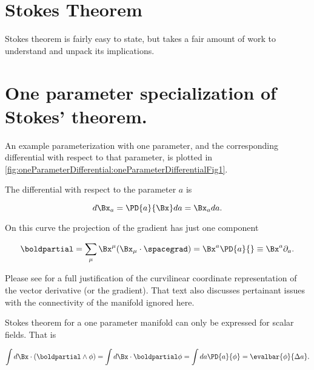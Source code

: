 %
%
\section{Stokes Theorem}

Stokes theorem is fairly easy to state, but takes a fair amount of work to understand and unpack its implications.



\section{One parameter specialization of Stokes' theorem.}

An example parameterization with one parameter, and the corresponding differential with respect to that parameter, is plotted in
\cref{fig:oneParameterDifferential:oneParameterDifferentialFig1}.


The differential with respect to the parameter \( a \) is

\begin{equation}\label{eqn:stokesTheoremCore:20}
d\Bx_a = \PD{a}{\Bx} da = \Bx_a da.
\end{equation}

On this curve the projection of the gradient has just one component

\begin{dmath}\label{eqn:stokesTheoremCore:40}
\boldpartial
=
\sum_\mu \Bx^\mu (\Bx_\mu \cdot \spacegrad)
=
\Bx^a \PD{a}{}
\equiv
\Bx^a \partial_a.
\end{dmath}

Please see \citep{aMacdonaldVAGC} for a full justification of the curvilinear coordinate representation of the vector derivative (or the gradient).  That text also discusses pertainant issues with the connectivity of the manifold ignored here.

Stokes theorem for a one parameter manifold can only be expressed for scalar fields.  That is

\begin{dmath}\label{eqn:stokesTheoremCore:60}
\int d\Bx \cdot (\boldpartial \wedge \phi)
=
\int d\Bx \cdot \boldpartial \phi
=
\int da \PD{a}{ \phi }
= \evalbar{\phi}{\Delta a}.
\end{dmath}

